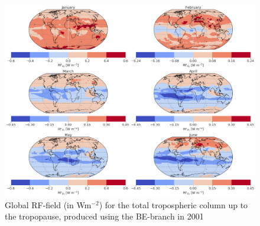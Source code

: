 
\begin{figure}[ht]
    \centering
    \includegraphics[width = \linewidth]{Chapter6_Results/images/RF/BE_RF_global_2001.png}
    \caption{Global RF-field (in Wm$^{-2}$) for the total tropospheric column up to the tropopause, produced using the BE-branch in 2001}
    \label{fig:BE_RF_global_2001}
\end{figure}